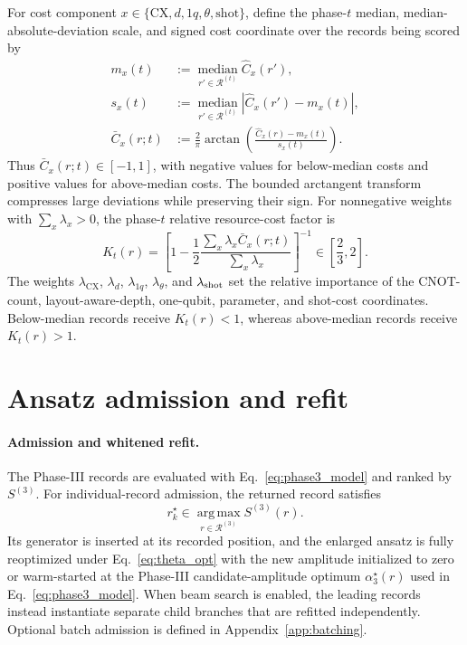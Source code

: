 \documentclass[
  reprint,
  amsmath,
  amssymb,
  aps,
  pra,
  nofootinbib,
  superscriptaddress,
  floatfix
]{revtex4-2}
\begin{document}
For cost component
\(x\in\{\mathrm{CX},d,1q,\theta,\mathrm{shot}\}\), define the
phase-\(t\) median, median-absolute-deviation scale, and signed cost coordinate
over the records being scored by \cite{IglewiczHoaglin1993}
\begin{equation}
\begin{aligned}
m_x(t)
&:=
\operatorname*{median}_{r'\in\mathcal R^{(t)}}
\widehat C_x(r'),\\
s_x(t)
&:=
\operatorname*{median}_{r'\in\mathcal R^{(t)}}
\left|\widehat C_x(r')-m_x(t)\right|,\\
\bar C_x(r;t)
&:=
\frac{2}{\pi}
\arctan\!\left(
\frac{\widehat C_x(r)-m_x(t)}{s_x(t)}
\right).
\end{aligned}
\label{eq:cost_robust_excess}
\end{equation}
Thus \(\bar C_x(r;t)\in[-1,1]\), with negative values for below-median costs
and positive values for above-median costs. The bounded arctangent transform
compresses large deviations while preserving their sign. For nonnegative
weights with \(\sum_x\lambda_x>0\), the phase-\(t\)
relative resource-cost factor is
\begin{equation}
K_t(r)
=
\left[
1-\frac{1}{2}
\frac{
\displaystyle\sum_x\lambda_x\bar C_x(r;t)
}{
\displaystyle\sum_x\lambda_x
}
\right]^{-1}
\in\left[\frac{2}{3},2\right].
\label{eq:hardware_cost_sum}
\end{equation}
%
The weights \(\lambda_{\mathrm{CX}}\), \(\lambda_d\), \(\lambda_{1q}\),
\(\lambda_\theta\), and \(\lambda_{\rm shot}\) set the relative importance of
the CNOT-count, layout-aware-depth, one-qubit, parameter, and shot-cost
coordinates. Below-median records receive \(K_t(r)<1\), whereas above-median
records receive \(K_t(r)>1\).

\section{Ansatz admission and refit}
\label{subsec:ansatz_admission_refit}
\paragraph*{Admission and whitened refit.}
%
The Phase-III records are evaluated with
Eq.~\eqref{eq:phase3_model} and ranked by \(S^{(3)}\). For individual-record
admission, the returned record satisfies
\begin{equation*}
r_k^\star
\in
\operatorname*{arg\,max}_{r\in\mathcal R^{(3)}}S^{(3)}(r).
\end{equation*}
Its generator is inserted at its recorded position, and the enlarged ansatz is
fully reoptimized under Eq.~\eqref{eq:theta_opt} with the new amplitude
initialized to zero or warm-started at the Phase-III candidate-amplitude
optimum \(\alpha_3^\star(r)\) used in Eq.~\eqref{eq:phase3_model}. When beam
search is enabled, the leading records instead instantiate separate child
branches that are refitted independently.
Optional batch admission is defined in Appendix~\ref{app:batching}.
\end{document}
